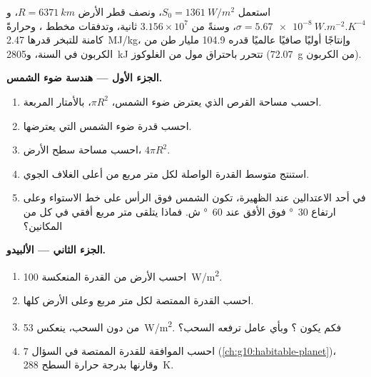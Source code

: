 \begin{problem}
\label{pb:g10:earth-energy-budget:1}
استعمل $S_0 = \qty{1361}{W/m^2}$، ونصف قطر الأرض $R = \qty{6371}{km}$،
و$\sigma = \qty{5.67e-8}{W.m^{-2}.K^{-4}}$، وسنةً من $3.156\times10^7$
ثانية، وتدفقات مخطط ، وحرارةً كامنة للتبخر قدرها
\qty{2.47}{MJ/kg}، وإنتاجًا أوليًا صافيًا عالميًا قدره
\num{104.9} مليار طن من الكربون في السنة، و\qty{2805}{kJ} تتحرر
باحتراق مول من الغلوكوز (\qty{72.07}{g} من الكربون).

\medskip
\noindent\textbf{الجزء الأول --- هندسة ضوء الشمس.}
\begin{enumerate}
  \item احسب مساحة القرص الذي يعترض ضوء الشمس، $\pi R^2$، بالأمتار
        المربعة.
  \item احسب قدرة ضوء الشمس التي يعترضها.
  \item احسب مساحة سطح الأرض، $4\pi R^2$.
  \item استنتج متوسط القدرة الواصلة لكل متر مربع من أعلى الغلاف
        الجوي.
  \item في أحد الاعتدالين عند الظهيرة، تكون الشمس فوق الرأس على خط الاستواء
        وعلى ارتفاع \qty{30}{\degree} فوق الأفق عند \qty{60}{\degree} ش. فماذا
        يتلقى متر مربع أفقي في كل من المكانين؟
\end{enumerate}

\medskip
\noindent\textbf{الجزء الثاني --- الألبيدو.}
\begin{enumerate}[resume]
  \item احسب  الأرض من القدرة المنعكسة \qty{100}{W/m^2}.
  \item احسب القدرة الممتصة لكل متر مربع وعلى الأرض كلها.
  \item من دون السحب، ينعكس \qty{53}{W/m^2}. فكم يكون ؟ وبأي عامل
        ترفعه السحب؟
  \item احسب  الموافقة للقدرة الممتصة في السؤال 7
        (\cref{ch:g10:habitable-planet})، وقارنها بدرجة حرارة السطح
        \qty{288}{K}.
\end{enumerate}


\end{problem}
